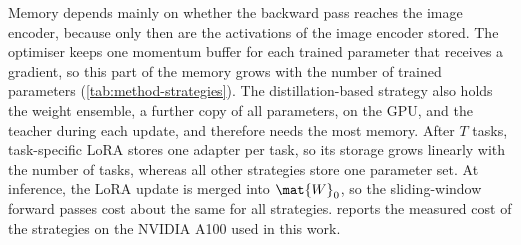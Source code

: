 Memory depends mainly on whether the backward pass reaches the image encoder, because only then are the activations of the image encoder stored.
The optimiser keeps one momentum buffer for each trained parameter that receives a gradient, so this part of the memory grows with the number of trained parameters (\cref{tab:method-strategies}).
The distillation-based strategy also holds the weight ensemble, a further copy of all parameters, on the GPU, and the teacher during each update, and therefore needs the most memory.
After $T$ tasks, task-specific LoRA stores one adapter per task, so its storage grows linearly with the number of tasks, whereas all other strategies store one parameter set.
At inference, the LoRA update is merged into $\mat{W}_0$, so the sliding-window forward passes cost about the same for all strategies.
 reports the measured cost of the strategies on the NVIDIA A100 used in this work.

